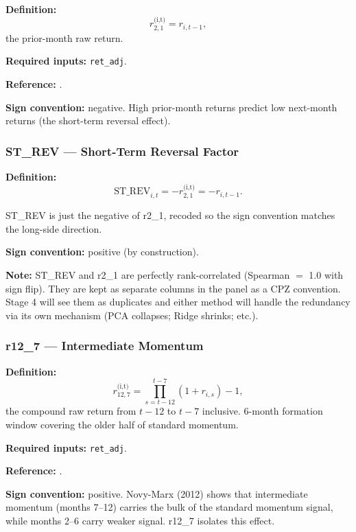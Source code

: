 \textbf{Definition:}
\begin{equation}
r_{2,1}^{\text{(i,t)}} = r_{i,t-1},
\label{eq:r2-1}
\end{equation}
the prior-month raw return.

\textbf{Required inputs:} \texttt{ret\_adj}.

\textbf{Reference:} \cite{Lehmann1990,JegadeeshTitman1993}.

\textbf{Sign convention:} negative. High prior-month returns
predict low next-month returns (the short-term reversal effect).

\subsubsection{ST\_REV --- Short-Term Reversal Factor}

\textbf{Definition:}
\begin{equation}
\mathrm{ST\_REV}_{i,t} = -r_{2,1}^{\text{(i,t)}} = -r_{i,t-1}.
\label{eq:st-rev}
\end{equation}

ST\_REV is just the negative of r2\_1, recoded so the sign convention
matches the long-side direction.

\textbf{Sign convention:} positive (by construction).

\textbf{Note:} ST\_REV and r2\_1 are perfectly rank-correlated (Spearman
$=$ 1.0 with sign flip). They are kept as separate columns in the
panel as a CPZ convention. Stage 4 will see them as duplicates and
either method will handle the redundancy via its own mechanism (PCA
collapses; Ridge shrinks; etc.).

\subsubsection{r12\_7 --- Intermediate Momentum}

\textbf{Definition:}
\begin{equation}
r_{12,7}^{\text{(i,t)}} = \prod_{s=t-12}^{t-7} (1 + r_{i,s}) - 1,
\label{eq:r12-7}
\end{equation}
the compound raw return from $t-12$ to $t-7$ inclusive. 6-month
formation window covering the older half of standard momentum.

\textbf{Required inputs:} \texttt{ret\_adj}.

\textbf{Reference:} \cite{NovyMarx2012}.

\textbf{Sign convention:} positive. Novy-Marx (2012) shows that
intermediate momentum (months 7--12) carries the bulk of the standard
momentum signal, while months 2--6 carry weaker signal. r12\_7
isolates this effect.

